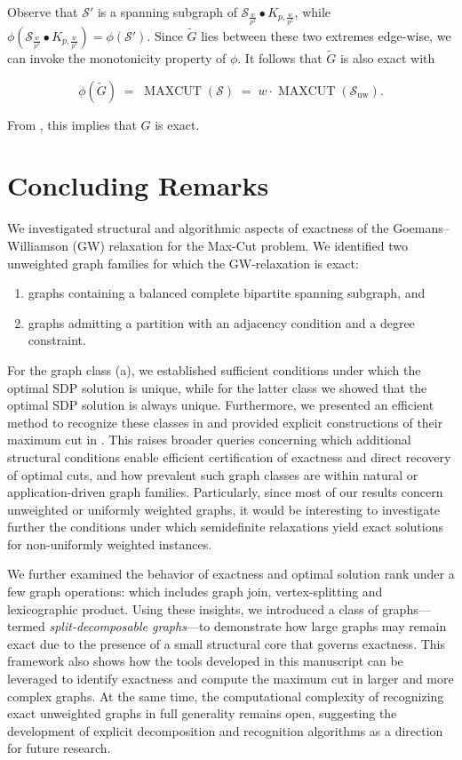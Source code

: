 \documentclass[a4paper,fleqn]{cas-sc}
\newcommand{\1}{\mathbf{1}}
\DeclareMathOperator{\mc}{MAXCUT}
\newcommand*{\myQED}{\hfill \scalebox{0.59}{\fbox{\rule{0.08mm}{0pt}\rule{0pt}{1.3mm}}}}%
\begin{document}
Observe that $\mathcal{S}'$ is a spanning subgraph of $\mathcal{S}_{\tfrac{w}{p^2}} \bullet K_{p,\tfrac{w}{p^2}}$, while $\phi\left(\mathcal{S}_{\tfrac{w}{p^2}} \bullet K_{p,\tfrac{w}{p^2}}\right) = \phi(\mathcal{S}')$. Since $\widetilde{G}$ lies between these two extremes edge-wise, we can invoke the monotonicity property of $\phi$. It follows that $\widetilde{G}$ is also exact with 

\begin{equation*}
 \phi(\widetilde{G}) \;=\; \mc(\mathcal{S}) \;=\; w \cdot \mc(\mathcal{S}_{\mathrm{uw}}).  
\end{equation*}

From , this implies that $G$ is exact. \hfill \myQED
\section{Concluding Remarks}\label{sec6} 

We investigated structural and algorithmic aspects of exactness of the Goemans--Williamson (GW) relaxation for the Max-Cut problem. We identified two unweighted graph families for which the GW-relaxation is exact:
\begin{enumerate}[label=\alph*)]
    \item graphs containing a balanced complete bipartite spanning subgraph, and 
    \item graphs admitting a partition with an adjacency condition and a degree constraint. 
\end{enumerate}
For the graph class (a), we established sufficient conditions under which the optimal SDP solution is unique, while for the latter class we showed that the optimal SDP solution is always unique. Furthermore, we presented an efficient method to recognize these classes in  and provided explicit constructions of their maximum cut in . This raises broader queries concerning which additional structural conditions enable efficient certification of exactness and direct recovery of optimal cuts, and how prevalent such graph classes are within natural or application-driven graph families. Particularly, since most of our results concern unweighted or uniformly weighted graphs, it would be interesting to investigate further the conditions
under which semidefinite relaxations yield exact solutions for non-uniformly weighted instances. 

We further examined the behavior of exactness and optimal solution rank under a few graph operations: which includes graph join, vertex-splitting and lexicographic product. Using these insights, we introduced a class of graphs—termed \emph{split-decomposable graphs}—to demonstrate how large graphs may remain exact due to the presence of a small structural core that governs exactness. This framework also shows how the tools developed in this manuscript can be leveraged to identify exactness and compute the maximum cut in larger and more complex graphs. At the same time, the computational complexity of recognizing exact unweighted graphs in full generality remains open, suggesting the development of explicit decomposition and recognition algorithms as a direction for future research.
\end{document}
